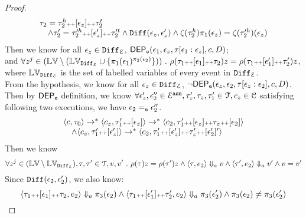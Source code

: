 \begin{proof}
\[\begin{array}{l}
	\trace_2 = \trace_2^h \tracecat [\event_z] \tracecat \trace_2^t
	\\ \quad
	\land 
	\trace_2' = \trace'^h_2 \tracecat [\event_z'] \tracecat \trace'^t_2
	\land 
	\diff(\event_z, \event_z')
	\land 
	\vcounter(\trace_2^h) \pi_1(\event_z) = \vcounter(\trace'^h_2)(\event_z)
\end{array}		
\]
%
Then we know for all $\event_z \in  \diff_{\eventset}$,
 $\eventdep(\event_1, \event_z, \trace[\event_1:\event_z], c, D)$;
\\
and $\forall z^j \in (\lvar \setminus (\mathbb{LV}_{\diff_{\eventset}} \cup\{\pi_1(\event_1)^{\pi_2(\event_2)}\}) ) \st 
\env(\trace_1 \tracecat [\event_1] \tracecat \trace_2) z = \env(\trace_1 \tracecat [\event_1'] \tracecat \trace_2') z $,
\\
where $\mathbb{LV}_{\diff_{\eventset}}$ is the set of labelled variables of every event in $\diff_{\eventset}$.
\\
From the hypothesis, we know for all $\event_z \in  \diff_{\eventset}$, $\neg \eventdep(\event_z, \event_2, \trace[\event_z:\event_2], c, D) $.
\\
Then by $\eventdep$ definition, we know 
$\forall \event_z', \event_2'' \in \eventset^{\asn}, \trace_z',\trace_z,  \trace_1' \in \mathcal{T}, c_z \in \cdom$ satisfying following two executions, we have $\event_2 \eventeq \event_2''$.
\[
	\begin{array}{l}
		\config{c, \trace_0} \rightarrow^{*}
		\config{c_z, \trace_1' \tracecat [\event_z]} \rightarrow^{*} \config{c_2, \trace_1' \tracecat [\event_z] \tracecat \trace_z \tracecat [\event_2]} 
		\\ \quad
		\land
		\config{c_z, \trace_1' \tracecat [\event_z']} \rightarrow^{*} \config{c_2, \trace_1' \tracecat [\event_z'] \tracecat \trace_z' \tracecat [\event_2']'} 
		\end{array}		
\]
%
Then we know 
\[
	\forall z^j \in (\lvar \setminus \mathbb{LV}_{\diff_{\eventset}} ), \trace, \trace' \in \mathcal{T}, v, v' \st 
	\env(\trace) z = \env(\trace') z 
	\land 
	\config{\trace, \expr_2} \aarrow v 
	\land 
	\config{\trace', \expr_2} \aarrow v'
	\land 
	v = v' 
\]
%
Since $\diff(\event_2, \event_2')$, we also know:
%
\[	
\config{\trace_1 \tracecat [\event_1] \tracecat \trace_2, \expr_2} \aarrow \pi_3(\event_2)
\land 
\config{\trace_1 \tracecat [\event_1'] \tracecat \trace_2', \expr_2} \aarrow \pi_3(\event_2') 
\land 
\pi_3(\event_2) \neq \pi_3(\event_2')
\]
%

\end{proof}
